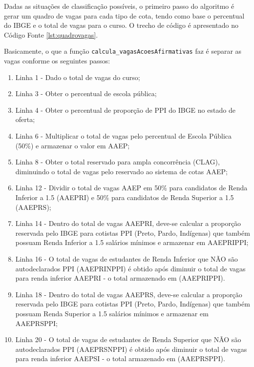 

\newpage
Dadas as situações de classificação possíveis, o primeiro passo do algoritmo é gerar um quadro de vagas para cada tipo de cota, tendo como base o percentual do \gls{IBGE} e o total de vagas para o curso. O trecho de código é apresentado no Código Fonte \ref{lst:quadrovagas}.




Basicamente, o que a função \texttt{calcula\_vagasAcoesAfirmativas} faz é separar as vagas conforme os seguintes passos:

\begin{enumerate}
    \item Linha 1 - Dado o total de vagas do curso;
    \item Linha 3 - Obter o percentual de escola pública;
    \item Linha 4 - Obter o percentual de proporção de PPI do IBGE no estado de oferta;
    \item Linha 6 - Multiplicar o total de vagas pelo percentual de Escola Pública (50\%) e armazenar o valor em AAEP;
    \item Linha 8 - Obter o total reservado para ampla concorrência (CLAG), diminuindo o total de vagas pelo reservado ao sistema de cotas AAEP;
    \item Linha 12 - Dividir o total de vagas AAEP em 50\% para candidatos de Renda Inferior a 1.5 (AAEPRI) e 50\% para candidatos de Renda Superior a 1.5 (AAEPRS);
    \item Linha 14 - Dentro do total de vagas AAEPRI, deve-se calcular a proporção reservada pelo IBGE para cotistas PPI (Preto, Pardo, Indígenas) que também possuam Renda Inferior a 1.5 salários mínimos e armazenar em AAEPRIPPI;
    \item Linha 16 - O total de vagas de estudantes de Renda Inferior que NÃO são autodeclarados PPI (AAEPRINPPI) é obtido após diminuir o total de vagas para renda inferior AAEPRI - o total armazenado em (AAEPRIPPI).
    \item Linha 18 - Dentro do total de vagas AAEPRS, deve-se calcular a proporção reservada pelo IBGE para cotistas PPI (Preto, Pardo, Indígenas) que também possuam Renda Superior a 1.5 salários mínimos e armazenar em AAEPRSPPI;
    \item Linha 20 - O total de vagas de estudantes de Renda Superior que NÃO são autodeclarados PPI (AAEPRSNPPI) é obtido após diminuir o total de vagas para renda inferior AAEPSI - o total armazenado em (AAEPRSPPI).
\end{enumerate}{}

